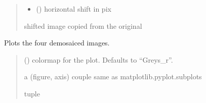\documentclass[letterpaper,10pt,english]{sphinxmanual}
\begin{document}
\begin{fulllineitems}
\begin{fulllineitems}
\begin{quote}
\begin{description}
\begin{itemize}
\item {} 
\sphinxAtStartPar
{} () \textendash{} horizontal shift in pix

\end{itemize}

\sphinxAtStartPar
shifted image copied from the original

\sphinxAtStartPar
{\hyperref[\detokenize{micropolarray:micropolarray.micropol_image.MicropolImage}]{}}

\end{description}\end{quote}

\end{fulllineitems}


\begin{fulllineitems}
\label{\detokenize{micropolarray:micropolarray.micropol_image.MicropolImage.show_demo_images}}
\pysigstartsignatures
{}
\pysigstopsignatures
\sphinxAtStartPar
Plots the four demosaiced images.
\begin{quote}\begin{description}
\sphinxAtStartPar
{} (\sphinxstyleliteralemphasis{\sphinxupquote{, }}) \textendash{} colormap for the plot. Defaults to “Greys\_r”.

\sphinxAtStartPar
a (figure, axis) couple same as matplotlib.pyplot.subplots

\sphinxAtStartPar
tuple

\end{description}\end{quote}

\end{fulllineitems}



\end{fulllineitems}
\end{document}
